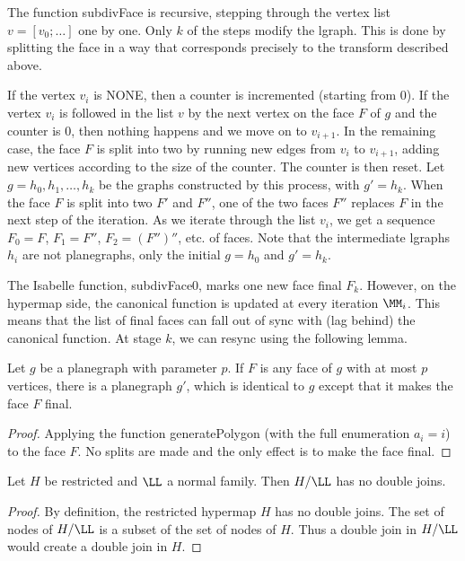 The function subdivFace is recursive, stepping through the vertex list
$v=[v_0;\ldots]$ one by one.  Only $k$ of the steps modify the lgraph.
This is done by splitting the face in a way that corresponds precisely
to the transform described above.

If the vertex $v_i$ is NONE, then a counter is incremented (starting
from 0).  If the vertex $v_i$ is followed in the list $v$ by the next
vertex on the face $F$ of $g$ and the counter is $0$, then nothing
happens and we move on to $v_{i+1}$.  In the remaining case, the face
$F$ is split into two by running new edges from $v_i$ to $v_{i+1}$,
adding new vertices according to the size of the counter.  The counter
is then reset.  Let $g=h_0,h_1,\ldots,h_k$ be the graphs constructed
by this process, with $g' = h_k$.  When the face $F$ is split into two
$F'$ and $F''$, one of the two faces $F''$ replaces $F$ in the next
step of the iteration.  As we iterate through the list $v_i$, we get a
sequence $F_0=F$, $F_1 =F''$, $F_2 = (F'')''$, etc.  of faces.  Note
that the intermediate lgraphs $h_i$ are not planegraphs, only the
initial $g=h_0$ and $g'=h_k$.

The Isabelle function, subdivFace0, marks one new face final $F_k$.
However, on the hypermap side, the canonical function is updated at
every iteration $\MM_i$.  This means that the list of final faces can
fall out of sync with (lag behind) the canonical function.  At stage
$k$, we can resync using the following lemma.

\begin{lemma}
  Let $g$ be a planegraph with parameter $p$.  If $F$ is any face of
  $g$ with at most $p$ vertices, there is a planegraph $g'$, which is
  identical to $g$ except that it makes the face $F$ final.
\end{lemma} 

\begin{proof}
  Applying the function generatePolygon (with the full enumeration
  $a_i=i$) to the face $F$.  No splits are made and the only effect is
  to make the face final.
\end{proof}

\begin{lemma} Let $H$ be restricted and $\LL$ a normal family.
Then $H/\LL$ has no double joins.
\end{lemma} 

\begin{proof}
By definition, the restricted hypermap $H$  has no double joins.
The set of nodes of $H/\LL$ is a subset of the set of nodes of $H$.
Thus a double join in $H/\LL$ would create a double join in $H$.
\end{proof}


